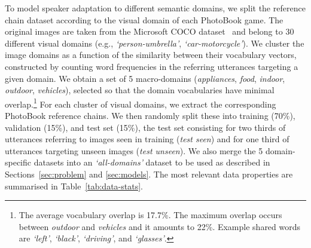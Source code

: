 To model speaker adaptation to different semantic domains, we split the reference chain dataset according to the visual domain of each PhotoBook game. The original images are taken from the Microsoft COCO dataset~\citep{lin2014coco} and belong to 30 different visual domains (e.g., \textit{`person-umbrella'}, \textit{`car-motorcycle'}). We cluster the image domains as a function of the similarity between their vocabulary vectors, constructed by counting word frequencies in the referring utterances targeting a given domain. We obtain a set of 5 macro-domains (\textit{appliances}, \textit{food}, \textit{indoor}, \textit{outdoor}, \textit{vehicles}), selected so that the domain vocabularies have minimal overlap.\footnote{The average vocabulary overlap is 17.7\%. The maximum overlap occurs between \textit{outdoor} and \textit{vehicles} and it amounts to 22\%. Example shared words are \textit{`left'}, \textit{`black'}, \textit{`driving'}, and \textit{`glasses'}.}
For each cluster of visual domains, we extract the corresponding PhotoBook reference chains. We then randomly split these into training (70\%), validation (15\%), and test set (15\%),
the test set consisting for two thirds of utterances referring to images seen in training (\textit{test seen}) and for one third of utterances targeting unseen images (\textit{test unseen}). We also merge the 5 domain-specific datasets into an \textit{`all-domains'} dataset to be used as described in Sections~\ref{sec:problem}
and \ref{sec:models}. The most relevant data properties are summarised in Table~\ref{tab:data-stats}. 


